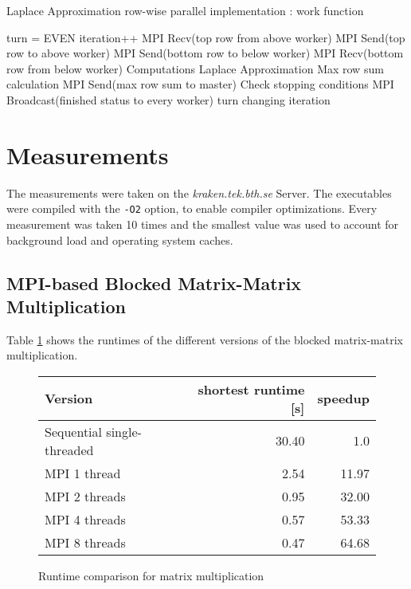 \documentclass[]{article}
\begin{document}
\begin{algorithm}
	\caption{Laplace Approximation row-wise parallel implementation : work function}
	\label{laplace_work}
	\begin{algorithmic}
		\STATE turn = EVEN
			\STATE iteration++
				\STATE MPI Recv(top row from above worker)
				\STATE MPI Send(top row to above worker)
			\ENDIF
				\STATE MPI Send(bottom row to below worker)
				\STATE MPI Recv(bottom row from below worker)
			\ENDIF
			\STATE Computations Laplace Approximation
			\STATE Max row sum calculation
				\STATE MPI Send(max row sum to master)
			\ELSE 
				\STATE Check stopping conditions
			\ENDIF
			\STATE MPI Broadcast(finished status to every worker)
			\STATE turn changing 
		\ENDWHILE
		\RETURN iteration
	\end{algorithmic}
\end{algorithm}

\section{Measurements}

The measurements were taken on the \emph{kraken.tek.bth.se} Server. The executables were compiled with the \texttt{-O2} option, to enable compiler optimizations. Every measurement was taken 10 times and the smallest value was used to account for background load and operating system caches.

\subsection{MPI-based Blocked Matrix-Matrix Multiplication}

 Table \ref{tab:matrix-mult-runtime} shows the runtimes of the different versions of the blocked matrix-matrix multiplication.

\begin{figure}[h]
	\centering
	\begin{tabular}{|l|r|r|}
		\hline
		\textbf{Version} & \textbf{shortest runtime [s]} & \textbf{speedup} \\
		\hline
		Sequential single-threaded	& 30.40	& 1.0 \\ 
		\hline 
		MPI 1 thread				& 2.54	& 11.97 \\ 
		\hline 
		MPI 2 threads				& 0.95	& 32.00 \\ 
		\hline 
		MPI 4 threads				& 0.57	& 53.33 \\ 
		\hline 
		MPI 8 threads				& 0.47	& 64.68 \\ 
		\hline 
	\end{tabular} 
	\caption{Runtime comparison for matrix multiplication}
	\label{tab:matrix-mult-runtime}
\end{figure}
\end{document}
